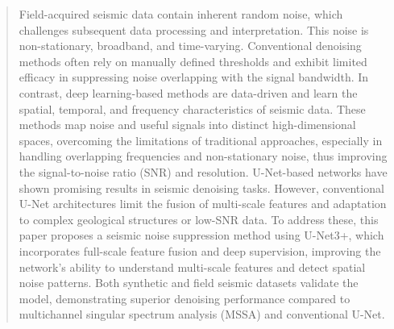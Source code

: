 \documentclass[preprint,12pt,authoryear]{elsarticle}
\begin{document}
\begin{frontmatter}
            
\begin{abstract}
Field-acquired seismic data contain inherent random noise, which challenges subsequent data processing and interpretation. This noise is non-stationary, broadband, and time-varying. Conventional denoising methods often rely on manually defined thresholds and exhibit limited efficacy in suppressing noise overlapping with the signal bandwidth. In contrast, deep learning-based methods are data-driven and learn the spatial, temporal, and frequency characteristics of seismic data. These methods map noise and useful signals into distinct high-dimensional spaces, overcoming the limitations of traditional approaches, especially in handling overlapping frequencies and non-stationary noise, thus improving the signal-to-noise ratio (SNR) and resolution. U-Net-based networks have shown promising results in seismic denoising tasks. However, conventional U-Net architectures limit the fusion of multi-scale features and adaptation to complex geological structures or low-SNR data. To address these, this paper proposes a seismic noise suppression method using U-Net3+, which incorporates full-scale feature fusion and deep supervision, improving the network's ability to understand multi-scale features and detect spatial noise patterns. Both synthetic and field seismic datasets validate the model, demonstrating superior denoising performance compared to multichannel singular spectrum analysis (MSSA) and conventional U-Net.
\end{abstract}



\end{frontmatter}
\end{document}
